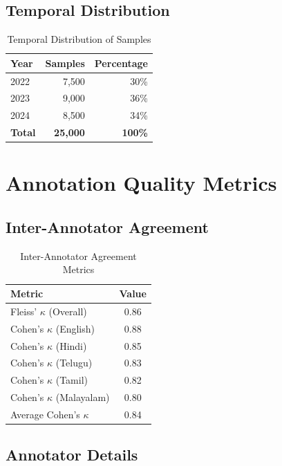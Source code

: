 \documentclass[10pt,a4paper]{article}
\begin{document}
\subsection{Temporal Distribution}

\begin{table}[h]
\centering
\caption{Temporal Distribution of Samples}
\begin{tabular}{lrr}
\toprule
\rowcolor{headerblue}
\textbf{Year} & \textbf{Samples} & \textbf{Percentage} \\
\midrule
2022 & 7,500  & 30\% \\
2023 & 9,000  & 36\% \\
2024 & 8,500  & 34\% \\
\midrule
\textbf{Total} & \textbf{25,000} & \textbf{100\%} \\
\bottomrule
\end{tabular}
\end{table}

\section{Annotation Quality Metrics}

\subsection{Inter-Annotator Agreement}

\begin{table}[h]
\centering
\caption{Inter-Annotator Agreement Metrics}
\begin{tabular}{lc}
\toprule
\rowcolor{headerblue}
\textbf{Metric} & \textbf{Value} \\
\midrule
Fleiss' $\kappa$ (Overall)     & 0.86 \\
Cohen's $\kappa$ (English)     & 0.88 \\
Cohen's $\kappa$ (Hindi)       & 0.85 \\
Cohen's $\kappa$ (Telugu)      & 0.83 \\
Cohen's $\kappa$ (Tamil)       & 0.82 \\
Cohen's $\kappa$ (Malayalam)   & 0.80 \\
\midrule
Average Cohen's $\kappa$       & 0.84 \\
\bottomrule
\end{tabular}
\end{table}

\subsection{Annotator Details}
\end{document}
